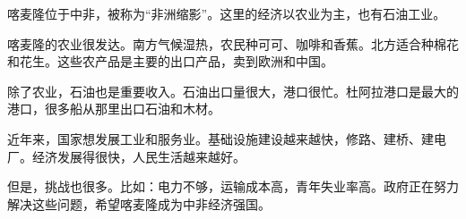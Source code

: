\documentclass[11pt]{article}
\begin{document}
\begin{textebox}
喀麦隆位于中非，被称为“非洲缩影”。这里的经济以农业为主，也有石油工业。

喀麦隆的农业很发达。南方气候湿热，农民种可可、咖啡和香蕉。北方适合种棉花和花生。这些农产品是主要的出口产品，卖到欧洲和中国。

除了农业，石油也是重要收入。石油出口量很大，港口很忙。杜阿拉港口是最大的港口，很多船从那里出口石油和木材。

近年来，国家想发展工业和服务业。基础设施建设越来越快，修路、建桥、建电厂。经济发展得很快，人民生活越来越好。

但是，挑战也很多。比如：电力不够，运输成本高，青年失业率高。政府正在努力解决这些问题，希望喀麦隆成为中非经济强国。
\end{textebox}
\end{document}
